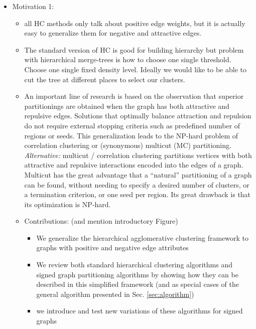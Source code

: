 \begin{itemize}
\item Motivation 1:

\begin{itemize}

\item all HC methods only talk about positive edge weights, but it is actually easy to generalize them for negative and attractive edges. 
\item The standard version of HC is good for building hierarchy but problem with hierarchical merge-trees is how to choose one single threshold. Choose one single fixed density level. Ideally we would like to be able to cut the tree at different places to select our clusters.
\item An important line of research is based on the observation that superior partitionings are obtained when the graph has both attractive and repulsive edges. Solutions that optimally balance attraction and repulsion do not require external stopping criteria such as predefined number of regions or seeds. This generalization leads to the NP-hard problem of correlation clustering or (synonymous) multicut (MC) partitioning. \emph{Alternative:} multicut / correlation clustering partitions vertices with both attractive and repulsive interactions encoded into the edges of a graph. Multicut has the great advantage that a “natural” partitioning of a graph can be found, without needing to specify a desired number of clusters, or a termination criterion, or one seed per region. Its great drawback is that its optimization is NP-hard.

\item Contributions: (and mention introductory Figure)
\begin{itemize}
\item We generalize the hierarchical agglomerative clustering framework to graphs with positive and negative edge attributes
\item We review both standard hierarchical clustering algorithms and signed graph partitioning algorithms by showing how they can be described in this simplified framework (and as special cases of the general algorithm presented in Sec. \ref{sec:algorithm})
\item we introduce and test new variations of these algorithms for signed graphs
\end{itemize}
\end{itemize}


\end{itemize}
